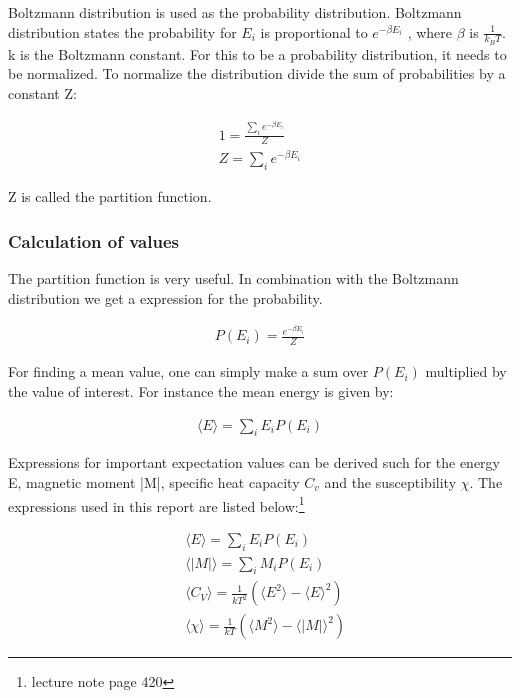 Boltzmann distribution is used as the probability distribution. Boltzmann distribution states the probability for $E_i$ is proportional to $e^{-\beta E_i}$ , where $\beta$ is $\frac{1}{k_BT}$. k is the Boltzmann constant. For this to be a probability distribution, it needs to be normalized. To normalize the distribution divide the sum of probabilities by a constant Z:

\begin{align*}
	1 = \frac{\sum_{i} e^{-\beta E_i}}{Z}
	\\
	Z = \sum_{i} e^{-\beta E_i}
\end{align*}

Z is called the partition function.

\subsubsection{Calculation of values}\label{sec:expect}

The partition function is very useful. In combination with the Boltzmann distribution we get a expression for the probability.

\begin{align*}
	P(E_i) = \frac{e^{-\beta E_i}}{Z}
\end{align*}

For finding a mean value, one can simply make a sum over $P(E_i)$ multiplied by the value of interest. For instance the mean energy is given by:

\begin{align*}
	\langle E \rangle = \sum_i E_i P(E_i)
\end{align*}

Expressions for important expectation values can be derived such for the energy E, magnetic moment |M|, specific heat capacity $C_v$ and the susceptibility $\chi$. The expressions used in this report are listed below\cite{compphys}:\footnote{lecture note page 420}

\begin{align}
	&\langle E \rangle = \sum_i E_iP(E_i)
	\label{eq:E}
	\\
	&\langle |M| \rangle = \sum_i M_iP(E_i)
	\label{eq:M}
	\\
	&\langle C_V \rangle = \frac{1}{k T^2}
	\left(
	\langle E^2 \rangle - \langle E \rangle ^2
	\right)
	\label{eq:cv}
	\\
	&\langle \chi \rangle = \frac{1}{kT}
	\left(
	\langle M^2 \rangle - \langle |M| \rangle ^2
	\right)
	\label{eq:chi}
\end{align}












